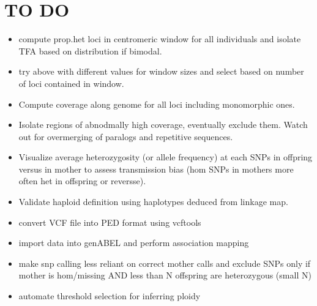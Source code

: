 \documentclass[10pt,a4paper]{report}
\begin{document}
\chapter{TO DO}
\begin{itemize}
\item compute prop.het loci in centromeric window for all individuals and isolate TFA based on distribution if bimodal.
\item try above with different values for window sizes and select based on number of loci contained in window.
\item Compute coverage along genome for all loci including monomorphic ones.
\item Isolate regions of abnodmally high coverage, eventually exclude them. Watch out for overmerging of paralogs and repetitive sequences.
\item Visualize average heterozygosity (or allele frequency) at each SNPs in offpring versus in mother to assess transmission bias (hom SNPs in mothers more often het in offspring or reversse). 
\item Validate haploid definition using haplotypes deduced from linkage map.
\item convert VCF file into PED format using vcftools
\item import data into genABEL and perform association mapping
\item make snp calling less reliant on correct mother calls and exclude SNPs only if mother is hom/missing AND less than N offspring are heterozygous (small N)
\item automate threshold selection for inferring ploidy
\end{itemize}
\end{document}
